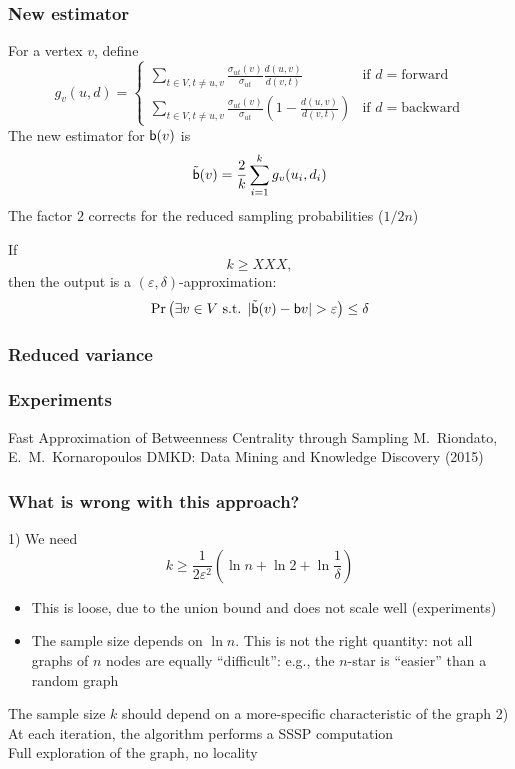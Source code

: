 \begin{frame}
  \frametitle{New estimator}
  For a vertex $v$, define
  \[
    g_v(u,d)=\left\{\begin{array}{ll}
        \sum_{t\in V,t\neq u,v} \frac{\sigma_{ut}(v)}{\sigma_{ut}}\frac{d(u,v)}{d(v,t)}
        & \text{if } d=\text{forward}\\
        \sum_{t\in V,t\neq u,v}
        \frac{\sigma_{ut}(v)}{\sigma_{ut}}\left(1-\frac{d(u,v)}{d(v,t)}\right)
        & \text{if } d=\text{backward}\end{array}\right.
  \]
  \pause
  The new estimator for $\mathsf{b}(v)$ is
  \[
    \tilde{\mathsf{b}}(v)=\frac{2}{k}\sum_{i=1}^k g_v(u_i,d_i)
  \]
  The factor $2$ corrects for the reduced sampling probabilities ($1/2n$)
  \pause
  \begin{theorem}
    If
    \[
      k\ge XXX,
    \]
    then the output is a $(\varepsilon,\delta)$-approximation:
    \[
      \Pr\left(\exists v\in V \text{ s.t. }
      |\tilde{\betw}(v)-\betw{v}|>\varepsilon\right)\le \delta
    \]
    \vspace{-10pt}
  \end{theorem}
\end{frame}

\begin{frame}
  \frametitle{Reduced variance}
\end{frame}

\begin{frame}
  \frametitle{Experiments}
\end{frame}

\begin{frame}
  \centering
  \vfill
  {\huge Fast Approximation of Betweenness Centrality through Sampling}
  \vfill
  {\Large M.~Riondato, E.~M.~Kornaropoulos}
  \vfill
  {\large DMKD: Data Mining and Knowledge Discovery (2015)}
  \vfill
\end{frame}

\begin{frame}
  \frametitle{What is wrong with this approach?}
  1) We need
  \[
    k\ge\frac{1}{2\varepsilon^2}\left(\ln n + \ln 2 +
    \ln\frac{1}{\delta}\right)
  \]
  \begin{itemize}
    \item This is loose, due to the union bound and does not scale well (experiments)
    \item The sample size depends on $\ln n$. This is not the right
      quantity: not all graphs of $n$ nodes are equally ``difficult'': e.g., the $n$-star is ``easier'' than a random graph
  \end{itemize}
  The sample size $k$ should depend on a more-specific characteristic of the graph
  \vfill
  2) At each iteration, the algorithm performs a SSSP computation\\
  \quad Full exploration of the graph, no locality
\end{frame}

